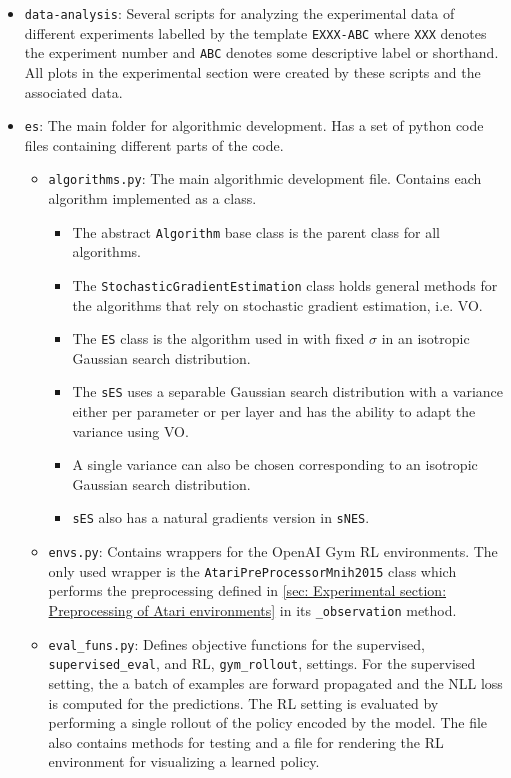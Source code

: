 \begin{itemize}
    \item \texttt{data-analysis}: Several scripts for analyzing the experimental data of different experiments labelled by the template \texttt{EXXX-ABC} where \texttt{XXX} denotes the experiment number and \texttt{ABC} denotes some descriptive label or shorthand. All plots in the experimental section were created by these scripts and the associated data.
    \item \texttt{es}: The main folder for algorithmic development. Has a set of python code files containing different parts of the code.
        \begin{itemize}
            \item \texttt{algorithms.py}: The main algorithmic development file. Contains each algorithm implemented as a class.
                \begin{itemize}
                    \item The abstract \texttt{Algorithm} base class is the parent class for all algorithms.
                    \item The \texttt{StochasticGradientEstimation} class holds general methods for the algorithms that rely on stochastic gradient estimation, i.e. \gls{VO}.
                    \item The \texttt{ES} class is the algorithm used in \cite{Salimans2017} with fixed $\sigma$ in an isotropic Gaussian search distribution.
                    \item The \texttt{sES} uses a separable Gaussian search distribution with a variance either per parameter or per layer and has the ability to adapt the variance using \gls{VO}.
                    \item A single variance can also be chosen corresponding to an isotropic Gaussian search distribution.
                    \item \texttt{sES} also has a natural gradients version in \texttt{sNES}.
                \end{itemize}
            \item \texttt{envs.py}: Contains wrappers for the OpenAI Gym \gls{RL} environments. The only used wrapper is the \texttt{AtariPreProcessorMnih2015} class which performs the preprocessing defined in \autoref{sec: Experimental section: Preprocessing of Atari environments} in its \texttt{\_observation} method.
            \item \texttt{eval\_funs.py}: Defines objective functions for the supervised, \texttt{supervised\_eval}, and \gls{RL}, \texttt{gym\_rollout}, settings. For the supervised setting, the a batch of examples are forward propagated and the \gls{NLL} loss is computed for the predictions. The \gls{RL} setting is evaluated by performing a single rollout of the policy encoded by the model. The file also contains methods for testing and a file for rendering the \gls{RL} environment for visualizing a learned policy.

\end{itemize}
\end{itemize}
